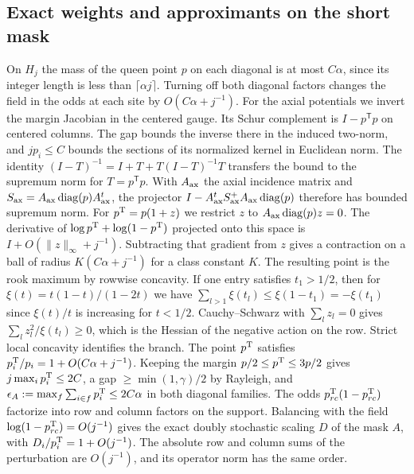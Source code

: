 \subsection{Exact weights and approximants on the short mask}
On \(H_j\) the mass of the queen point \(p\) on each diagonal is at most \(C\alpha\), since its integer
length is less than \(\lceil\alpha j\rceil\). Turning off both diagonal factors changes the field in the
odds at each site by \(O(C\alpha+j^{-1})\). For the axial potentials we invert the margin Jacobian in the
centered gauge. Its Schur complement is \(I-p^{\mathsf T}p\) on centered columns. The gap bounds the
inverse there in the induced two-norm, and \(jp_i\le C\) bounds the sections of its normalized kernel in
Euclidean norm. The identity \((I-T)^{-1}=I+T+T(I-T)^{-1}T\) transfers the bound to the supremum norm for
\(T=p^{\mathsf T}p\). With \(A_{\rm ax}\) the axial incidence matrix and \(S_{\rm ax}=A_{\rm
ax}\operatorname{diag}(p)A_{\rm ax}^t\), the projector \(I-A_{\rm ax}^t S_{\rm ax}^+A_{\rm
ax}\operatorname{diag}(p)\) therefore has bounded supremum norm. For \(p^{\rm T}=p(1+z)\) we restrict
\(z\) to \(A_{\rm ax}\operatorname{diag}(p)z=0\). The derivative of \(\log p^{\rm T}+\log(1-p^{\rm T})\)
projected onto this space is \(I+O(\|z\|_\infty+j^{-1})\). Subtracting that gradient from \(z\) gives a
contraction on a ball of radius \(K(C\alpha+j^{-1})\) for a class constant \(K\). The resulting point is
the rook maximum by rowwise concavity. If one entry satisfies \(t_1>1/2\), then for
\(\xi(t)=t(1-t)/(1-2t)\) we have \(\sum_{l>1}\xi(t_l)\le\xi(1-t_1)=-\xi(t_1)\) since \(\xi(t)/t\) is
increasing for \(t<1/2\). Cauchy--Schwarz with \(\sum_l z_l=0\) gives \(\sum_l z_l^2/\xi(t_l)\ge0\),
which is the Hessian of the negative action on the row. Strict local concavity identifies the branch. The
point \(p^{\rm T}\) satisfies \(p^{\rm T}_i/p_i=1+O(C\alpha+j^{-1})\). Keeping the margin \(p/2\le p^{\rm
T}\le3p/2\) gives \(j\max_i p^{\rm T}_i\le2C\), a gap \(\ge\min(1,\gamma)/2\) by Rayleigh, and
\(\epsilon_A:=\max_f\sum_{i\in f}p^{\rm T}_i\le2C\alpha\) in both diagonal families. The odds \(p^{\rm
T}_{rc}(1-p^{\rm T}_{rc})\) factorize into row and column factors on the support. Balancing with the
field \(\log(1-p^{\rm T}_{rc})=O(j^{-1})\) gives the exact doubly stochastic scaling \(D\) of the mask
\(A\), with \(D_i/p^{\rm T}_i=1+O(j^{-1})\). The absolute row and column sums of the perturbation are
\(O(j^{-1})\), and its operator norm has the same order.


